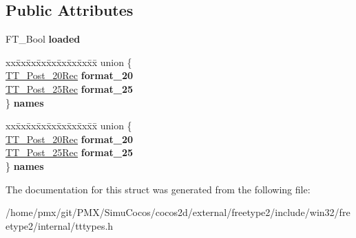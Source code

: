 \subsection*{Public Attributes}
\begin{DoxyCompactItemize}
\item 
\mbox{\label{structTT__Post__NamesRec___a8878ac4555c3df60958869f0d53383c9}} 
F\+T\+\_\+\+Bool {\bfseries loaded}
\item 
\mbox{\label{structTT__Post__NamesRec___a59164ec7859cbc641ae6ea89aab98939}} 
\begin{tabbing}
xx\=xx\=xx\=xx\=xx\=xx\=xx\=xx\=xx\=\kill
union \{\\
\>\hyperlink{structTT__Post__20Rec__}{TT\_Post\_20Rec} {\bfseries format\_20}\\
\>\hyperlink{structTT__Post__25__}{TT\_Post\_25Rec} {\bfseries format\_25}\\
\} {\bfseries names}\\

\end{tabbing}\item 
\mbox{\label{structTT__Post__NamesRec___af36c64e4f47463064491f48ad39b6418}} 
\begin{tabbing}
xx\=xx\=xx\=xx\=xx\=xx\=xx\=xx\=xx\=\kill
union \{\\
\>\hyperlink{structTT__Post__20Rec__}{TT\_Post\_20Rec} {\bfseries format\_20}\\
\>\hyperlink{structTT__Post__25__}{TT\_Post\_25Rec} {\bfseries format\_25}\\
\} {\bfseries names}\\

\end{tabbing}\end{DoxyCompactItemize}


The documentation for this struct was generated from the following file\+:\begin{DoxyCompactItemize}
\item 
/home/pmx/git/\+P\+M\+X/\+Simu\+Cocos/cocos2d/external/freetype2/include/win32/freetype2/internal/tttypes.\+h\end{DoxyCompactItemize}
